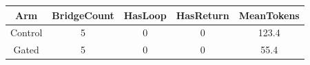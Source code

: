 \begin{table}[h]
\centering
\begin{tabular}{ |c|c|c|c|c| }
\hline
Arm & BridgeCount & HasLoop & HasReturn & MeanTokens \\
\hline
Control & 5 & 0 & 0 & 123.4 \\
\hline
Gated & 5 & 0 & 0 & 55.4 \\
\hline
\end{tabular}
\end{table}

